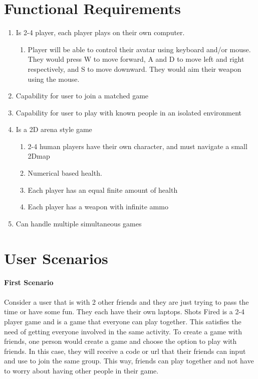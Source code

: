 \documentclass[11pt, oneside]{article}   	%
\begin{document}
\clearpage

\section{Functional Requirements}
\begin{enumerate}
\item Is 2-4 player, each player plays on their own computer. 
\begin{enumerate}
\item Player will be able to control their avatar using keyboard and/or mouse.
      They would press W to move forward, A and D to move left and right
      respectively, and S to move downward.  They would aim their weapon using the mouse.
\end{enumerate}
\item Capability for user to join a matched game
\item Capability for user to play with known people in an isolated environment
\item Is a 2D arena style game
\begin{enumerate}
\item 2-4 human players have their own character, and must navigate a small 2Dmap
\item Numerical based health.
\item Each player has an equal finite amount of health
\item Each player has a weapon with infinite ammo
\end{enumerate}
\item Can handle multiple simultaneous games
\end{enumerate}

\section{User Scenarios}


\textbf{First Scenario}\\\\

Consider a user that is with 2 other friends and they are just trying to pass the time or have some fun. They each have their own laptops. Shots Fired is a 2-4 player game and is a game that everyone can play together. This satisfies the need of getting everyone involved in the same activity. To create a game with friends, one person would create a game and choose the option to play with friends. In this case, they will receive a code or url that their friends can input and use to join the same group. This way, friends can play together and not have to worry about having other people in their game. \\\\
\end{document}
